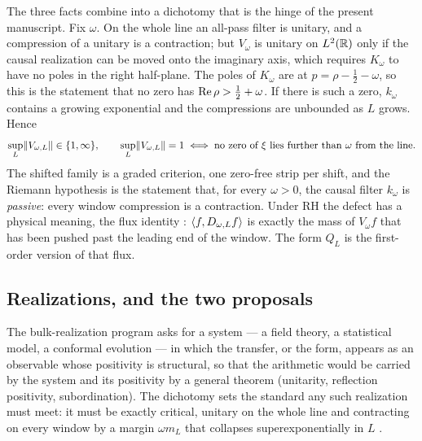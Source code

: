 The three facts combine into a dichotomy \cite[Proposition~7.2]{WilsonLines}
that is the hinge of the present manuscript. Fix $\omega$. On the whole line an
all-pass filter is unitary, and a compression of a unitary is a contraction; but
$V_\omega$ is unitary on $L^2(\mathbb R)$ only if the causal realization can be moved
onto the imaginary axis, which requires $K_\omega$ to have no poles in the right
half-plane. The poles of $K_\omega$ are at $p=\rho-\frac12-\omega$, so this is
the statement that no zero has $\operatorname{Re}\rho>\frac12+\omega$. If there is such a
zero, $k_\omega$ contains a growing exponential and the compressions are
unbounded as $L$ grows. Hence
\begin{equation}\label{eq:intro-dichotomy}
 \sup_L\lVert V_{\omega,L}\rVert\in\{1,\infty\},\qquad
 \sup_L\lVert V_{\omega,L}\rVert=1\iff\text{no zero of $\xi$ lies further than $\omega$ from the line.}
\end{equation}
The shifted family is a graded criterion, one zero-free strip per shift, and
the Riemann hypothesis is the statement that, for every $\omega>0$, the causal
filter $k_\omega$ is \emph{passive}: every window compression is a contraction.
Under RH the defect has a physical meaning, the flux identity
\cite[Proposition~4.5]{WilsonLines}: $\langle f,D_{\omega,L}f\rangle$ is exactly the mass
of $V_\omega f$ that has been pushed past the leading end of the window. The
form $Q_L$ is the first-order version of that flux.

\subsection{Realizations, and the two proposals}

The bulk-realization program asks for a system --- a field theory, a
statistical model, a conformal evolution --- in which the transfer, or the
form, appears as an observable whose positivity is structural, so that the
arithmetic would be carried by the system and its positivity by a general
theorem (unitarity, reflection positivity, subordination). The dichotomy sets
the standard any such realization must meet: it must be exactly critical,
unitary on the whole line and contracting on every window by a margin
$\omega m_L$ that collapses superexponentially in $L$ \cite[Section~8]{WilsonLines}.

